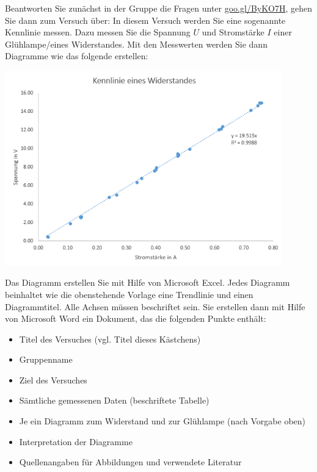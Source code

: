 \documentclass[11pt,twoside=false,open=any]{scrbook}
\begin{document}
\begin{tcolorbox}[breakable,colback=gray!20, title=Versuch 1: Kennlinie von Glühlampe und Widerstandselement]
Beantworten Sie zunächst in der Gruppe die Fragen unter \href{https://goo.gl/ByKO7H}{goo.gl/ByKO7H}, gehen Sie dann zum Versuch über: \newline
In diesem Versuch werden Sie eine sogenannte Kennlinie messen. Dazu messen Sie die Spannung $U$ und Stromstärke $I$ einer Glühlampe/eines Widerstandes. Mit den Messwerten werden Sie dann Diagramme wie das folgende erstellen:

\begin{center}
   \includegraphics[width=12cm]{Bilder/Kennlinie1.png}
\end{center}



Das Diagramm erstellen Sie mit Hilfe von Microsoft Excel. Jedes Diagramm beinhaltet wie die obenstehende Vorlage eine Trendlinie und einen Diagrammtitel. Alle Achsen müssen beschriftet sein. Sie erstellen dann mit Hilfe von Microsoft Word ein Dokument, das die folgenden Punkte enthält:
\begin{itemize}
    \item Titel des Versuches (vgl. Titel dieses Kästchens)
    \item Gruppenname
    \item Ziel des Versuches 
    \item Sämtliche gemessenen Daten (beschriftete Tabelle)
    \item Je ein Diagramm zum Widerstand und zur Glühlampe (nach Vorgabe oben)
    \item Interpretation der Diagramme
    \item Quellenangaben für Abbildungen und verwendete Literatur
\end{itemize}


\end{tcolorbox}
\end{document}
